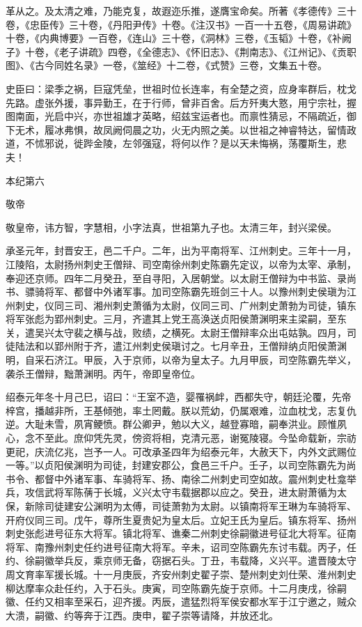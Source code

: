 \documentclass[12pt,UTF8]{ctexbook}
\begin{document}
革从之。及太清之难，乃能克复，故遐迩乐推，遂膺宝命矣。所著《孝德传》三十卷，《忠臣传》三十卷，《丹阳尹传》十卷。《注汉书》一百一十五卷，《周易讲疏》十卷，《内典博要》一百卷，《连山》三十卷，《洞林》三卷，《玉韬》十卷，《补阙子》十卷，《老子讲疏》四卷，《全德志》、《怀旧志》、《荆南志》、《江州记》、《贡职图》、《古今同姓名录》一卷，《筮经》十二卷，《式赞》三卷，文集五十卷。

史臣曰：梁季之祸，巨寇凭垒，世祖时位长连率，有全楚之资，应身率群后，枕戈先路。虚张外援，事异勤王，在于行师，曾非百舍。后方歼夷大憝，用宁宗社，握图南面，光启中兴，亦世祖雄才英略，绍兹宝运者也。而禀性猜忌，不隔疏近，御下无术，履冰弗惧，故凤阙伺晨之功，火无内照之美。以世祖之神睿特达，留情政道，不怵邪说，徙跸金陵，左邻强寇，将何以作？是以天未悔祸，荡覆斯生，悲夫！





本纪第六

敬帝

敬皇帝，讳方智，字慧相，小字法真，世祖第九子也。太清三年，封兴梁侯。

承圣元年，封晋安王，邑二千户。二年，出为平南将军、江州刺史。三年十一月，江陵陷，太尉扬州刺史王僧辩、司空南徐州刺史陈霸先定议，以帝为太宰、承制，奉迎还京师。四年二月癸丑，至自寻阳，入居朝堂。以太尉王僧辩为中书监、录尚书、骠骑将军、都督中外诸军事。加司空陈霸先班剑三十人。以豫州刺史侯瑱为江州刺史，仪同三司、湘州刺史萧循为太尉，仪同三司、广州刺史萧勃为司徒，镇东将军张彪为郢州刺史。三月，齐遣其上党王高涣送贞阳侯萧渊明来主梁嗣，至东关，遣吴兴太守裴之横与战，败绩，之横死。太尉王僧辩率众出屯姑孰。四月，司徒陆法和以郢州附于齐，遣江州刺史侯瑱讨之。七月辛丑，王僧辩纳贞阳侯萧渊明，自采石济江。甲辰，入于京师，以帝为皇太子。九月甲辰，司空陈霸先举义，袭杀王僧辩，黜萧渊明。丙午，帝即皇帝位。

绍泰元年冬十月己巳，诏曰：“王室不造，婴罹祸衅，西都失守，朝廷沦覆，先帝梓宫，播越非所，王基倾弛，率土罔戴。朕以荒幼，仍属艰难，泣血枕戈，志复仇逆。大耻未雪，夙宵鲠愤。群公卿尹，勉以大义，越登寡暗，嗣奉洪业。顾惟夙心，念不至此。庶仰凭先灵，傍资将相，克清元恶，谢冤陵寝。今坠命载新，宗祊更祀，庆流亿兆，岂予一人。可改承圣四年为绍泰元年，大赦天下，内外文武赐位一等。”以贞阳侯渊明为司徒，封建安郡公，食邑三千户。壬子，以司空陈霸先为尚书令、都督中外诸军事、车骑将军、扬、南徐二州刺史司空如故。震州刺史杜龛举兵，攻信武将军陈蒨于长城，义兴太守韦载据郡以应之。癸丑，进太尉萧循为太保，新除司徒建安公渊明为太傅，司徒萧勃为太尉。以镇南将军王琳为车骑将军、开府仪同三司。戊午，尊所生夏贵妃为皇太后。立妃王氏为皇后。镇东将军、扬州刺史张彪进号征东大将军。镇北将军、谯秦二州刺史徐嗣徽进号征北大将军。征南将军、南豫州刺史任约进号征南大将军。辛未，诏司空陈霸先东讨韦载。丙子，任约、徐嗣徽举兵反，乘京师无备，窃据石头。丁丑，韦载降，义兴平。遣晋陵太守周文育率军援长城。十一月庚辰，齐安州刺史翟子崇、楚州刺史刘仕荣、淮州刺史柳达摩率众赴任约，入于石头。庚寅，司空陈霸先旋于京师。十二月庚戌，徐嗣徽、任约又相率至采石，迎齐援。丙辰，遣猛烈将军侯安都水军于江宁邀之，贼众大溃，嗣徽、约等奔于江西。庚申，翟子崇等请降，并放还北。
\end{document}
